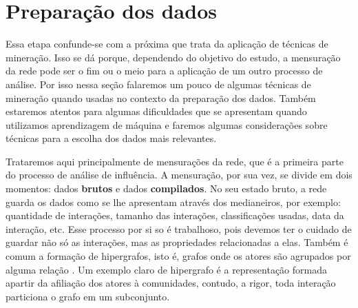 \chapter{Preparação dos dados}
\label{ch:preparacao}

Essa etapa confunde-se com a próxima que trata da aplicação de técnicas de
mineração. Isso se dá porque, dependendo do objetivo do estudo, a mensuração da
rede pode ser o fim ou o meio para a aplicação de um outro processo de análise.
Por isso nessa seção falaremos um pouco de algumas técnicas de mineração quando
usadas no contexto da preparação dos dados. Também estaremos atentos para
algumas dificuldades que se apresentam quando utilizamos aprendizagem de
máquina e faremos algumas considerações sobre técnicas para a escolha dos dados
mais relevantes.

Trataremos aqui principalmente de mensurações da rede, que é a primeira parte do
processo de análise de influência. A mensuração, por sua vez, se divide em dois
momentos: dados \textbf{brutos} e dados \textbf{compilados}. No seu estado bruto,
a rede guarda os dados como se lhe apresentam através dos medianeiros, por
exemplo: quantidade de interações, tamanho das interações, classificações usadas,
data da interação, etc. Esse processo por si so é trabalhoso, pois devemos ter o
cuidado de guardar não só as interações, mas as propriedades relacionadas a elas.
Também é comum a formação de hipergrafos, isto é, grafos onde os atores são
agrupados por alguma relação \citep{Breiger1974, Seidman1978}. Um exemplo
claro de hipergrafo é a representação formada apartir da afiliação dos atores à
comunidades, contudo, a rigor, toda interação particiona o grafo em um
subconjunto.
